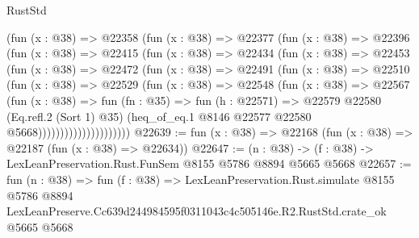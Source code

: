\begin{lexlean}{RustStd}
\begin{coremodule}
                  (fun (x : @38) =>
                  @22358
                    (fun (x : @38) =>
                    @22377
                      (fun (x : @38) =>
                      @22396
                        (fun (x : @38) =>
                        @22415
                          (fun (x : @38) =>
                          @22434
                            (fun (x : @38) =>
                            @22453
                              (fun (x : @38) =>
                              @22472
                                (fun (x : @38) =>
                                @22491
                                  (fun (x : @38) =>
                                  @22510
                                    (fun (x : @38) =>
                                    @22529
                                      (fun (x : @38) =>
                                      @22548
                                        (fun (x : @38) =>
                                        @22567
                                          (fun (x : @38) =>
                                          fun (fn : @35) =>
                                          fun (h : @22571) =>
                                          @22579
                                            @22580
                                            (Eq.refl.{2} (Sort 1) @35)
                                            (heq_of_eq.{1}
                                              @8146
                                              @22577
                                              @22580
                                              @5668)))))))))))))))))))))
@22639 := fun (x : @38) => @22168 (fun (x : @38) => @22187 (fun (x : @38) => @22634))
@22647 := (n : @38) -> (f : @38) -> LexLeanPreservation.Rust.FunSem @8155 @5786 @8894 @5665 @5668
@22657 := fun (n : @38) =>
  fun (f : @38) =>
  LexLeanPreservation.Rust.simulate
    @8155
    @5786
    @8894
    LexLeanPreserve.Cc639d244984595f0311043c4c505146e.R2.RustStd.crate_ok
    @5665
    @5668
\end{coremodule}
\end{lexlean}
